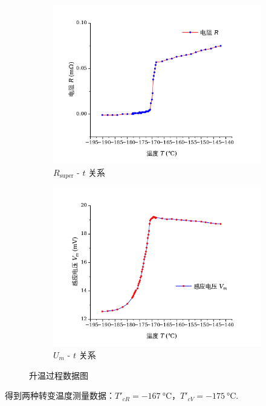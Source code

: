\documentclass{THUexprep}
\begin{document}
\begin{figure}[H]
    \centering
    \begin{subfigure}{0.45\textwidth}
        \centering
        \includegraphics[width=\textwidth]{R-T2.png}
        \caption{$R_\text{super}$ - $t$ 关系}
    \end{subfigure}
    \begin{subfigure}{0.45\textwidth}
        \centering
        \includegraphics[width=\textwidth]{V_m-T2.png}
        \caption{$U_m$ - $t$ 关系}
    \end{subfigure}
    \caption{升温过程数据图}
\end{figure}

得到两种转变温度测量数据：$T'_{cR}=\SI{-167}{\celsius}$，$T'_{cV}=\SI{-175}{\celsius}$.
\end{document}
